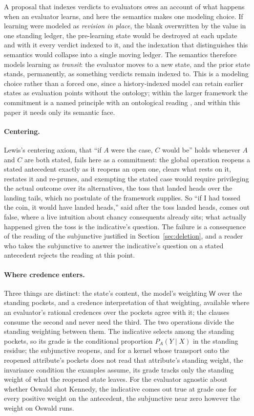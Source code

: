 A proposal that indexes verdicts to evaluators owes an account of what happens when an evaluator learns, and here the semantics makes one modeling choice. If learning were modeled as \emph{revision in place}, the blank overwritten by the value in one standing ledger, the pre-learning state would be destroyed at each update and with it every verdict indexed to it, and the indexation that distinguishes this semantics would collapse into a single moving ledger. The semantics therefore models learning as \emph{transit}: the evaluator moves to a new state, and the prior state stands, permanently, as something verdicts remain indexed to. This is a modeling choice rather than a forced one, since a history-indexed model can retain earlier states as evaluation points without the ontology; within the larger framework the commitment is a named principle with an ontological reading \parencite{Aethus, AethusBrief}, and within this paper it needs only its semantic face.

\paragraph{Centering.} Lewis's centering axiom, that ``if $A$ were the case, $C$ would be'' holds whenever $A$ and $C$ are both stated, fails here as a commitment: the global operation reopens a stated antecedent exactly as it reopens an open one, clears what rests on it, restates it and re-prunes, and exempting the stated case would require privileging the actual outcome over its alternatives, the toss that landed heads over the landing tails, which no postulate of the framework supplies. So ``if I had tossed the coin, it would have landed heads,'' said after the toss landed heads, comes out false, where a live intuition about chancy consequents already sits; what actually happened given the toss is the indicative's question. The failure is a consequence of the reading of the subjunctive justified in Section~\ref{sec:deletion}, and a reader who takes the subjunctive to answer the indicative's question on a stated antecedent rejects the reading at this point.

\paragraph{Where credence enters.} Three things are distinct: the state's content, the model's weighting $\mathsf{W}$ over the standing pockets, and a credence interpretation of that weighting, available where an evaluator's rational credences over the pockets agree with it; the clauses consume the second and never need the third. The two operations divide the standing weighting between them. The indicative selects among the standing pockets, so its grade is the conditional proportion $P_A(Y \mid X)$ in the standing residue; the subjunctive reopens, and for a kernel whose transport onto the reopened attribute's pockets does not read that attribute's standing weight, the invariance condition the examples assume, its grade tracks only the standing weight of what the reopened state leaves. For the evaluator agnostic about whether Oswald shot Kennedy, the indicative comes out true at grade one for every positive weight on the antecedent, the subjunctive near zero however the weight on Oswald runs.


